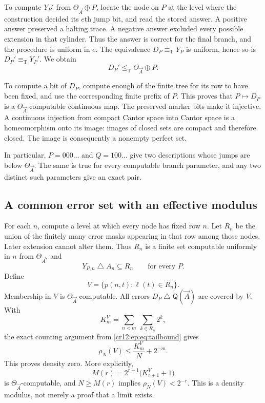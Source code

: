 \documentclass[11pt,letterpaper]{article}
\theoremstyle{plain}
\theoremstyle{definition}
\theoremstyle{remark}
\numberwithin{equation}{section}
\newcommand{\leT}{\leq_{\mathrm T}}
\newcommand{\eqT}{\equiv_{\mathrm T}}
\newcommand{\sd}{\mathbin{\triangle}}
\newcommand{\QQ}{\mathsf Q}              %
\begin{document}
To compute $Y_P'$ from $\Theta_{\vec A}\oplus P$, locate the node on $P$ at the level
where the construction decided its $e$th jump bit, and read the stored answer. A
positive answer preserved a halting trace. A negative answer excluded every possible
extension in that cylinder. Thus the answer is correct for the final branch, and the
procedure is uniform in $e$. The equivalence $D_P\eqT Y_P$ is uniform, hence so is
$D_P'\eqT Y_P'$. We obtain
\begin{equation}\label{cr12:ep:eq:jump-bound}
 D_P'\leT \Theta_{\vec A}\oplus P.
\end{equation}

To compute a bit of $D_P$, compute enough of the finite tree for its row to have
been fixed, and use the corresponding finite prefix of $P$. This proves that
$P\mapsto D_P$ is a $\Theta_{\vec A}$-computable continuous map. The preserved marker
bits make it injective. A continuous injection from compact Cantor space into Cantor
space is a homeomorphism onto its image: images of closed sets are compact and
therefore closed. The image is consequently a nonempty perfect set.

In particular, $P=000\ldots$ and $Q=100\ldots$ give two descriptions whose jumps are
below $\Theta_{\vec A}$. The same is true for every computable branch parameter, and
any two distinct such parameters give an exact pair.

\subsection{A common error set with an effective modulus}
For each $n$, compute a level at which every node has fixed row $n$. Let $R_n$ be the
union of the finitely many error masks appearing in that row among those nodes.
Later extension cannot alter them. Thus $R_n$ is a finite set computable uniformly in
$n$ from $\Theta_{\vec A}$, and
\[
 Y_{P,n}\sd A_n\subseteq R_n\qquad\text{for every }P.
\]
Define
\begin{equation}\label{cr12:ep:eq:V}
 V=\{p(n,t):\ell(t)\in R_n\}.
\end{equation}
Membership in $V$ is $\Theta_{\vec A}$-computable. All errors $D_P\sd\QQ(\vec A)$ are
covered by $V$. With
\[
 K_m^V=\sum_{n<m}\ \sum_{k\in R_n}2^k,
\]
the exact counting argument from \eqref{cr12:ep:eq:tailbound} gives
\begin{equation}\label{cr12:ep:eq:V-bound}
 \rho_N(V)\le \frac{K_m^V}{N}+2^{-m}.
\end{equation}
This proves density zero. More explicitly,
\begin{equation}\label{cr12:ep:eq:modulus}
 M(r)=2^{r+1}\bigl(K_{r+1}^V+1\bigr)
\end{equation}
is $\Theta_{\vec A}$-computable, and $N\ge M(r)$ implies $\rho_N(V)<2^{-r}$. This is
a density modulus, not merely a proof that a limit exists.
\end{document}
